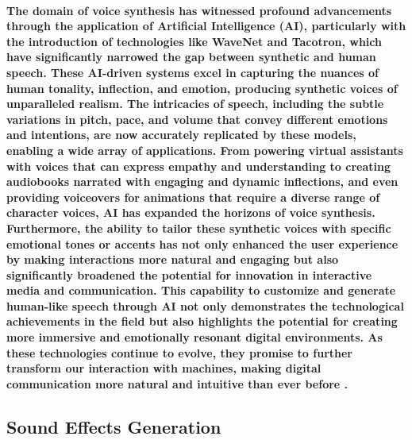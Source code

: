 \documentclass[11pt,a4paper,oneside]{report}
\begin{document}
\paragraph{The domain of voice synthesis has witnessed profound advancements through the application of Artificial Intelligence (AI), particularly with the introduction of technologies like WaveNet and Tacotron, which have significantly narrowed the gap between synthetic and human speech. These AI-driven systems excel in capturing the nuances of human tonality, inflection, and emotion, producing synthetic voices of unparalleled realism. The intricacies of speech, including the subtle variations in pitch, pace, and volume that convey different emotions and intentions, are now accurately replicated by these models, enabling a wide array of applications. From powering virtual assistants with voices that can express empathy and understanding to creating audiobooks narrated with engaging and dynamic inflections, and even providing voiceovers for animations that require a diverse range of character voices, AI has expanded the horizons of voice synthesis. Furthermore, the ability to tailor these synthetic voices with specific emotional tones or accents has not only enhanced the user experience by making interactions more natural and engaging but also significantly broadened the potential for innovation in interactive media and communication. This capability to customize and generate human-like speech through AI not only demonstrates the technological achievements in the field but also highlights the potential for creating more immersive and emotionally resonant digital environments. As these technologies continue to evolve, they promise to further transform our interaction with machines, making digital communication more natural and intuitive than ever before \cite{oord2016wavenet}.}
\subsection{Sound Effects Generation}
\end{document}
